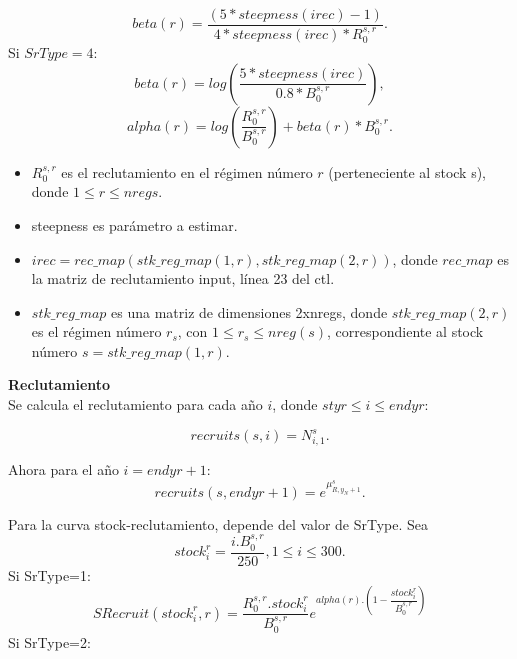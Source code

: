 \documentclass{article}
\begin{document}
\begin{equation}
    beta(r)=\dfrac{(5*steepness(irec)-1)}{4*steepness(irec)*R^{s,r}_0}.
\end{equation}
Si $SrType=4$:
\begin{equation}
    beta(r)=log\left(\dfrac{5*steepness(irec)}{0.8*B^{s,r}_0}\right),
\end{equation}
\begin{equation}
    alpha(r)=log\left(\dfrac{R^{s,r}_0}{B^{s,r}_0}\right)+beta(r)*B^{s,r}_0.
\end{equation}
\begin{itemize}
    \item $R^{s,r}_0$ es el reclutamiento en el régimen número $r$ (perteneciente al stock s), donde $1\leq r \leq nregs.$
    \item steepness es parámetro a estimar.
    \item $irec=rec\_map(stk\_reg\_map(1,r),stk\_reg\_map(2,r))$, donde $rec\_map$ es la matriz de reclutamiento input, línea 23 del ctl.
    \item $stk\_reg\_map$ es una matriz de dimensiones 2xnregs, donde $stk\_reg\_map(2,r)$ es el régimen número $r_s$, con $1\leq r_s \leq nreg(s)$, correspondiente al stock número $s=stk\_reg\_map(1,r)$.
\end{itemize}

\textbf{Reclutamiento}\\

Se calcula el reclutamiento para cada año $i$, donde $styr\leq i \leq endyr$:

\begin{equation}
    recruits(s,i)=N^s_{i,1}.
\end{equation}

Ahora para el año $i=endyr+1$:
\begin{equation}
    recruits(s,endyr+1)=e^{\mu^s_{R,y_N+1}}.
\end{equation}

Para la curva stock-reclutamiento, depende del valor de SrType. Sea 
\begin{equation}
    stock^r_i=\dfrac{i.B^{s,r}_0}{250}, 1\leq i \leq 300.
\end{equation}
Si SrType=1:
\begin{equation}
SRecruit(stock^r_i,r)=\dfrac{R^{s,r}_0.stock^r_i}{B^{s,r}_0}e^{alpha(r).\left(1-\dfrac{stock^r_i}{B^{s,r}_0}\right)}
\end{equation}
Si SrType=2:
\end{document}
